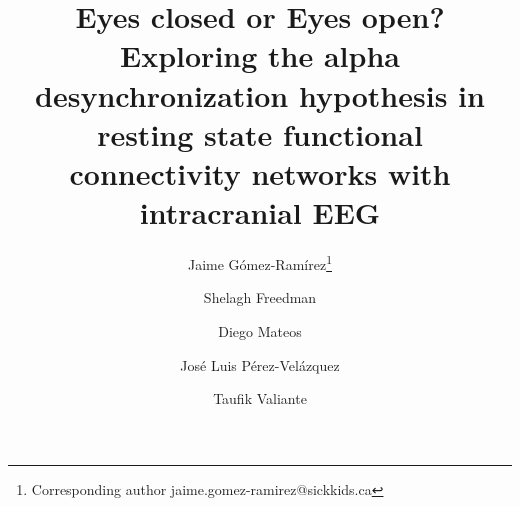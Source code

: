 \documentclass[11pt, onecolumn]{article}
\begin{document}
\def\mean#1{\left< #1 \right>}

\title{Eyes closed or Eyes open? Exploring the alpha desynchronization hypothesis in  resting state functional connectivity networks with intracranial EEG}
\author[1]{Jaime G{\'o}mez-Ram{\'i}rez\thanks{Corresponding author \hspace{0.6cm} jaime.gomez-ramirez@sickkids.ca}}
\author[2]{Shelagh Freedman}%
\author[1]{Diego Mateos}
\author[1]{Jos{\'e} Luis P{\'e}rez-Vel{\'a}zquez}
\author[3]{Taufik Valiante}
\affil[2]{}
\affil[3]{}
\date{}

\maketitle
\end{document}

